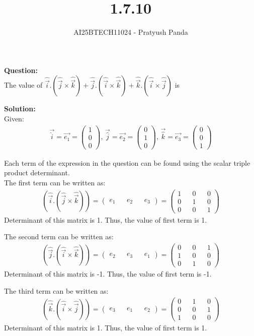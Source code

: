 \documentclass{beamer}
\title{1.7.10}
\author{AI25BTECH11024 - Pratyush Panda}
\providecommand{\brak}[1]{\ensuremath{\left(#1\right)}}
\theoremstyle{remark}
\newcommand{\myvec}[1]{\ensuremath{\begin{pmatrix}#1\end{pmatrix}}}
\numberwithin{equation}{section}
\begin{document}
\maketitle

\begin{frame}
\textbf{Question: } \\
The value of $\hat{\Vec{i}}.\brak{\hat{\Vec{j}} \times \hat{\Vec{k}}} + \hat{\Vec{j}}.\brak{\hat{\Vec{i}} \times \hat{\Vec{k}}} + \hat{\Vec{k}}.\brak{\hat{\Vec{i}} \times \hat{\Vec{j}}}$ is \underline{\hspace{2cm}}
\end{frame}

\begin{frame}
\textbf{Solution: } \\
Given:
\begin{align}
\Vec{\hat{i}}=\Vec{e_1}=\myvec{1 \\ 0 \\ 0}, \, \Vec{\hat{j}}=\Vec{e_2}=\myvec{0 \\ 1 \\ 0}, \, \Vec{\hat{k}}=\Vec{e_3}=\myvec{0 \\ 0 \\ 1}
\end{align}

Each term of the expression in the question can be found using the scalar triple product determinant.\\
The first term can be written as:
\begin{align}
\brak{\hat{\Vec{i}}.\brak{\hat{\Vec{j}} \times \hat{\Vec{k}}}} = 
\myvec{e_1 && e_2 && e_3} =
\myvec{1 && 0 && 0 \\
       0 && 1 && 0 \\
       0 && 0 && 1}
\end{align}
Determinant of this matrix is 1. Thus, the value of first term is 1.
\end{frame}

\begin{frame}
The second term can be written as:
\begin{align}
\brak{\hat{\Vec{j}}.\brak{\hat{\Vec{i}} \times \hat{\Vec{k}}}} = 
\myvec{e_2 && e_3 && e_1} =
\myvec{0 && 0 && 1 \\
       1 && 0 && 0 \\
       0 && 1 && 0}
\end{align}
Determinant of this matrix is -1. Thus, the value of first term is -1.

The third term can be written as:
\begin{align}
\brak{\hat{\Vec{k}}.\brak{\hat{\Vec{i}} \times \hat{\Vec{j}}}} = 
\myvec{e_3 && e_1 && e_2} =
\myvec{0 && 1 && 0 \\
       0 && 0 && 1 \\
       1 && 0 && 0}
\end{align}
Determinant of this matrix is 1. Thus, the value of first term is 1.
\end{frame}
\end{document}
